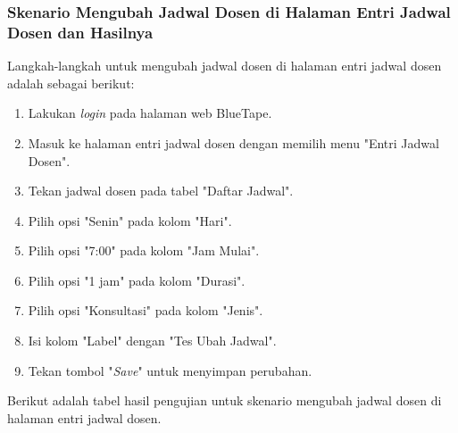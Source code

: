\subsubsection{Skenario Mengubah Jadwal Dosen di Halaman Entri Jadwal Dosen dan Hasilnya}
\label{subsubsec:skenario_mengubah_jadwal_dosen_di_halaman_entri_jadwal_dosen}
Langkah-langkah untuk mengubah jadwal dosen di halaman entri jadwal dosen adalah sebagai berikut:

\begin{enumerate}
    \item Lakukan \textit{login} pada halaman web BlueTape.
    \item Masuk ke halaman entri jadwal dosen dengan memilih menu "Entri Jadwal Dosen".
    \item Tekan jadwal dosen pada tabel "Daftar Jadwal".
    \item Pilih opsi "Senin" pada kolom "Hari".
    \item Pilih opsi "7:00" pada kolom "Jam Mulai".
    \item Pilih opsi "1 jam" pada kolom "Durasi".
    \item Pilih opsi "Konsultasi" pada kolom "Jenis".
    \item Isi kolom "Label" dengan "Tes Ubah Jadwal".
    \item Tekan tombol "\textit{Save}" untuk menyimpan perubahan.
\end{enumerate}

Berikut adalah tabel hasil pengujian untuk skenario mengubah jadwal dosen di halaman entri jadwal dosen.

